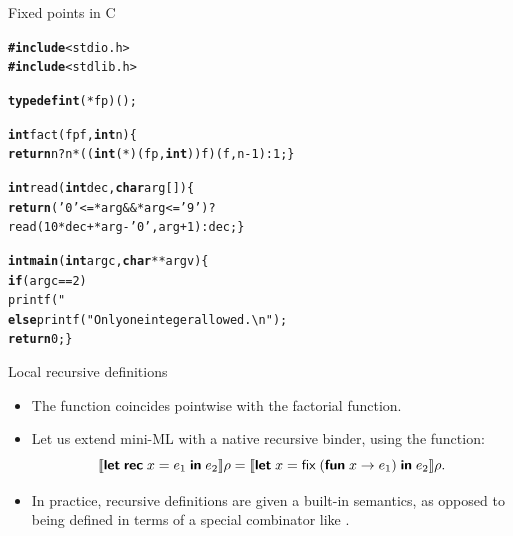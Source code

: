 %
\begin{frame}[fragile]{Fixed points in C}

\begin{alltt}
\footnotesize
\textbf{#include}<stdio.h>
\textbf{#include}<stdlib.h>

\textbf{typedef int} (*fp)();

\textbf{int} fact(fp f, \textbf{int} n) \{
  \textbf{return} n? n * ((\textbf{int} (*)(fp,\textbf{int}))f)(f,n-1) : 1; \}

\textbf{int} read(\textbf{int} dec, \textbf{char} arg[]) \{
  \textbf{return} ('0' <= *arg && *arg <= '9')?
         read(10*dec + *arg - '0', arg+1) : dec; \}

\textbf{int main}(\textbf{int} argc, \textbf{char}** argv) \{
  \textbf{if} (argc == 2)
     printf("%
  \textbf{else} printf("Only one integer allowed.\textbackslash{n}");
  \textbf{return} 0; \}
\end{alltt}
\end{frame}

%
\begin{frame}{Local recursive definitions}

  \begin{itemize}

    \item The function  coincides pointwise with the
      factorial function.

    \item Let us extend mini-ML with a native recursive binder, using
      the  function:
      \begin{equation*}
        \evalf{\Xlet \; \Xrec \; x = e_1 \; \Xin \; e_2}{\rho} =
        \evalf{\Xlet \; x = \textsf{fix} \; (\Xfun \; x \rightarrow
          e_1) \; \Xin \; e_2}{\rho}.
      \end{equation*}

    \item In practice, recursive definitions are given a built\hyp{}in
      semantics, as opposed to being defined in terms of a special
      combinator like .

  \end{itemize}

\end{frame}

